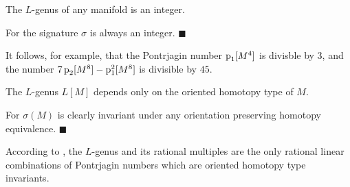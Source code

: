 \documentclass[../main]{subfiles}
\begin{document}
\begin{corollary}
\label{cor:19.05}
The $L$-genus of any manifold is an integer.
\end{corollary}
For the signature $\sigma$ is always an integer. \ensuremath{\blacksquare}

It follows, for example, that the Pontrjagin number $\operatorname{p}_1 [M^4] $ is divisble by $3$, and the number $7\operatorname{p}_2 [M^8] - \operatorname{p}_1^2 [M^8]$ is divisible by $45$.

\begin{corollary}
\label{cor:19.06}
The $L$-genus $L[M]$ depends only on the oriented homotopy type of $M$.
\end{corollary}
For $\sigma(M)$ is clearly invariant under any orientation preserving homotopy equivalence. \ensuremath{\blacksquare}

According to \cite{kahn}, the $L$-genus and its rational multiples are the only rational linear combinations of Pontrjagin numbers which are oriented homotopy type invariants.
\end{document}
